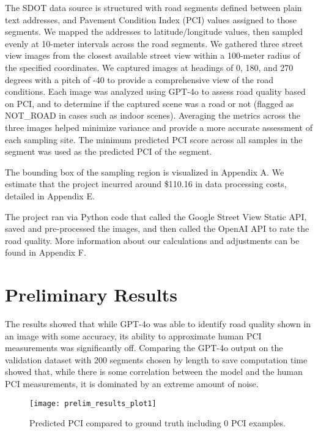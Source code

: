 \documentclass{article}
\begin{document}
The SDOT data source is structured with road segments defined between plain text addresses, and Pavement Condition Index (PCI) values assigned to those segments. We mapped the addresses to latitude/longitude values, then sampled evenly at 10-meter intervals across the road segments.
We gathered three street view images from the closest available street view within a 100-meter radius of the specified coordinates. We captured images at headings of 0, 180, and 270 degrees with a pitch of -40 to provide a comprehensive view of the road conditions. Each image was analyzed using GPT-4o to assess road quality based on PCI, and to determine if the captured scene was a road or not (flagged as NOT\_ROAD in cases such as indoor scenes). Averaging the metrics across the three images helped minimize variance and provide a more accurate assessment of each sampling site. The minimum predicted PCI score across all samples in the segment was used as the predicted PCI of the segment.

The bounding box of the sampling region is visualized in Appendix A. We estimate that the project incurred around \$110.16 in data processing costs, detailed in Appendix E.

The project ran via Python code that called the Google Street View Static API, saved and pre-processed the images, and then called the OpenAI API to rate the road quality. More information about our calculations and adjustments can be found in Appendix F.




\section{Preliminary Results}

The results showed that while GPT-4o was able to identify road quality shown in an image with some accuracy, its ability to approximate human PCI measurements was significantly off. Comparing the GPT-4o output on the validation dataset with 200 segments chosen by length to save computation time showed that, while there is some correlation between the model and the human PCI measurements, it is dominated by an extreme amount of noise.

\begin{figure}[ht]
\centering
    \texttt{[image: prelim\_results\_plot1]}
    \caption{\centering Predicted PCI compared to ground truth including 0 PCI examples. }
    \label{fig:verticalcell}
\end{figure}
\end{document}
